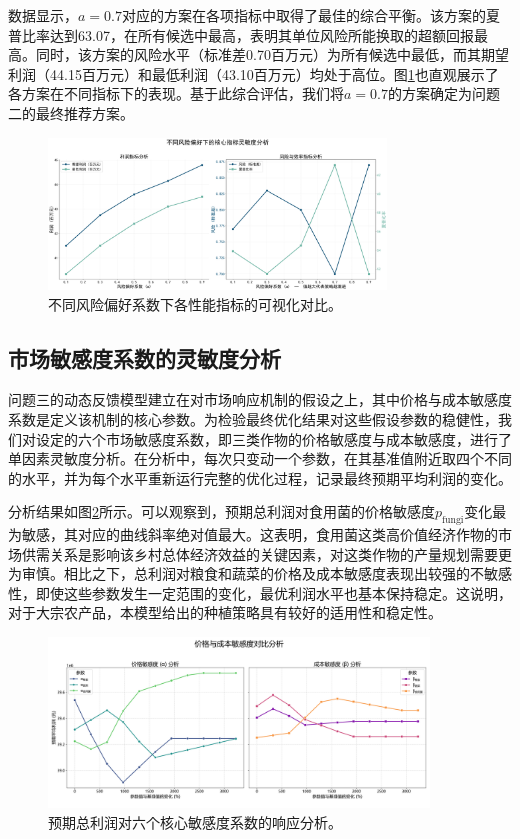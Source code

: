数据显示，$a=0.7$对应的方案在各项指标中取得了最佳的综合平衡。该方案的夏普比率达到63.07，在所有候选中最高，表明其单位风险所能换取的超额回报最高。同时，该方案的风险水平（标准差0.70百万元）为所有候选中最低，而其期望利润（44.15百万元）和最低利润（43.10百万元）均处于高位。图\ref{fig:risk_preference_comparison}也直观展示了各方案在不同指标下的表现。基于此综合评估，我们将$a=0.7$的方案确定为问题二的最终推荐方案。

\begin{figure}[H]
    \centering
    \includegraphics[width=0.8\textwidth]{figs/6灵敏度分析/第二问风险灵敏度.png}
    \caption{不同风险偏好系数下各性能指标的可视化对比。}
    \label{fig:risk_preference_comparison}
\end{figure}

\subsection{市场敏感度系数的灵敏度分析}

问题三的动态反馈模型建立在对市场响应机制的假设之上，其中价格与成本敏感度系数是定义该机制的核心参数。为检验最终优化结果对这些假设参数的稳健性，我们对设定的六个市场敏感度系数，即三类作物的价格敏感度与成本敏感度，进行了单因素灵敏度分析。在分析中，每次只变动一个参数，在其基准值附近取四个不同的水平，并为每个水平重新运行完整的优化过程，记录最终预期平均利润的变化。

分析结果如图\ref{fig:market_sensitivity}所示。可以观察到，预期总利润对食用菌的价格敏感度$p_{\text{fungi}}$变化最为敏感，其对应的曲线斜率绝对值最大。这表明，食用菌这类高价值经济作物的市场供需关系是影响该乡村总体经济效益的关键因素，对这类作物的产量规划需要更为审慎。相比之下，总利润对粮食和蔬菜的价格及成本敏感度表现出较强的不敏感性，即使这些参数发生一定范围的变化，最优利润水平也基本保持稳定。这说明，对于大宗农产品，本模型给出的种植策略具有较好的适用性和稳定性。

\begin{figure}[H]
    \centering
    \includegraphics[width=0.9\textwidth]{figs/6灵敏度分析/问题三灵敏度分析图.png}
    \caption{预期总利润对六个核心敏感度系数的响应分析。}
    \label{fig:market_sensitivity}
\end{figure}
